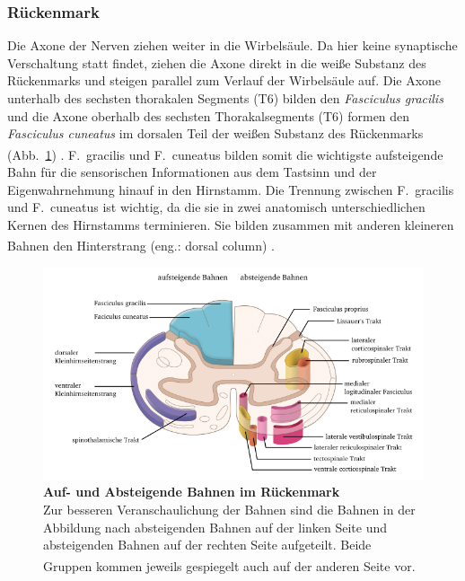 \documentclass[12pt,a4paper,pdftex]{article}
\begin{document}
\subsubsection*{Rückenmark}
Die Axone der Nerven ziehen weiter in die Wirbelsäule. Da hier keine synaptische Verschaltung statt findet, ziehen die Axone direkt in die weiße Substanz des Rückenmarks und steigen parallel zum Verlauf der Wirbelsäule auf. Die Axone unterhalb des sechsten thorakalen Segments (T6) bilden den \textit{Fasciculus gracilis}  und die Axone oberhalb des sechsten Thorakalsegments (T6) formen den \textit{Fasciculus cuneatus}  im dorsalen Teil der weißen Substanz des Rückenmarks (Abb.~\ref{fig:bahnen_rueckenmark}) \textsuperscript{\cite[8]{paxinos2014rat}}. F.~gracilis und F.~cuneatus bilden somit die wichtigste aufsteigende Bahn für die sensorischen Informationen aus dem Tastsinn und der Eigenwahrnehmung hinauf in den Hirnstamm. 
Die Trennung zwischen F.~gracilis und F.~cuneatus ist wichtig, da die sie in zwei anatomisch unterschiedlichen Kernen des Hirnstamms terminieren. Sie bilden zusammen mit anderen kleineren Bahnen den Hinterstrang (eng.: dorsal column) \textsuperscript{\cite[22]{kandel2013principles}}. 

\begin{figure}[H]
    \centering
    \includegraphics [width = \textwidth]
    {pictures/somatosensory/aufabsteigendeBahnen_Rueckenmark.png}
    \caption[Auf- und Absteigende Bahnen im Rückenmark]{\textbf{Auf- und Absteigende Bahnen im Rückenmark}\\ Zur besseren Veranschaulichung der Bahnen sind die Bahnen in der Abbildung nach absteigenden Bahnen auf der linken Seite und absteigenden Bahnen auf der rechten Seite aufgeteilt. Beide Gruppen kommen jeweils gespiegelt auch auf der anderen Seite vor.
    \textsuperscript{\cite[8]{crossman2014neuroanatomy}}}
    \label{fig:bahnen_rueckenmark}
\end{figure}
\end{document}
